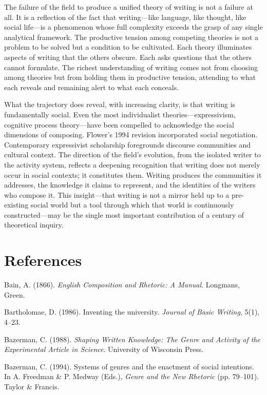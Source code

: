 \documentclass[12pt]{article}
\begin{document}
The failure of the field to produce a unified theory of writing is not a failure at all. It is a reflection of the fact that writing---like language, like thought, like social life---is a phenomenon whose full complexity exceeds the grasp of any single analytical framework. The productive tension among competing theories is not a problem to be solved but a condition to be cultivated. Each theory illuminates aspects of writing that the others obscure. Each asks questions that the others cannot formulate. The richest understanding of writing comes not from choosing among theories but from holding them in productive tension, attending to what each reveals and remaining alert to what each conceals.

What the trajectory does reveal, with increasing clarity, is that writing is fundamentally social. Even the most individualist theories---expressivism, cognitive process theory---have been compelled to acknowledge the social dimensions of composing. Flower's 1994 revision incorporated social negotiation. Contemporary expressivist scholarship foregrounds discourse communities and cultural context. The direction of the field's evolution, from the isolated writer to the activity system, reflects a deepening recognition that writing does not merely occur in social contexts; it constitutes them. Writing produces the communities it addresses, the knowledge it claims to represent, and the identities of the writers who compose it. This insight---that writing is not a mirror held up to a pre-existing social world but a tool through which that world is continuously constructed---may be the single most important contribution of a century of theoretical inquiry.

\newpage

\section*{References}

Bain, A. (1866). \textit{English Composition and Rhetoric: A Manual}. Longmans, Green.

Bartholomae, D. (1986). Inventing the university. \textit{Journal of Basic Writing}, 5(1), 4--23.

Bazerman, C. (1988). \textit{Shaping Written Knowledge: The Genre and Activity of the Experimental Article in Science}. University of Wisconsin Press.

Bazerman, C. (1994). Systems of genres and the enactment of social intentions. In A. Freedman \& P. Medway (Eds.), \textit{Genre and the New Rhetoric} (pp. 79--101). Taylor \& Francis.
\end{document}
